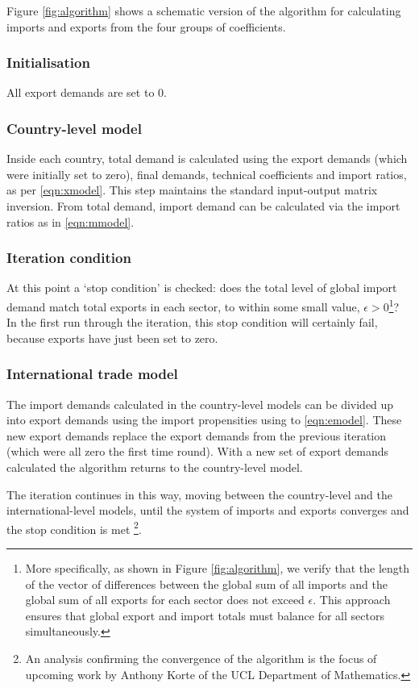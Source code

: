 \documentclass[a4paper]{article}
\begin{document}
Figure \ref{fig:algorithm} shows a schematic version of the algorithm for calculating imports and exports from the four groups of coefficients.
\subsubsection*{Initialisation}
All export demands are set to 0.

\subsubsection*{Country-level model}
Inside each country, total demand is calculated using the export demands (which were initially set to zero), final demands, technical coefficients and import ratios, as per \cref{eqn:xmodel}.
This step maintains the standard input-output matrix inversion.
From total demand, import demand can be calculated via the import ratios as in \cref{eqn:mmodel}.

\subsubsection*{Iteration condition}
At this point a `stop condition' is checked: does the total level of global import demand match total exports in each sector, to within some small value,  $\epsilon > 0$\footnote{More specifically, as shown in Figure \ref{fig:algorithm}, we verify that the length of the vector of differences between the global sum of all imports and the global sum of all exports for each sector does not exceed $\epsilon$. This approach ensures that global export and import totals must balance for all sectors simultaneously.}?
In the first run through the iteration, this stop condition will certainly fail, because exports have just been set to zero.

\subsubsection*{International trade model}
The import demands calculated in the country-level models can be divided up into export demands using the import propensities using to \cref{eqn:emodel}.
These new export demands replace the export demands from the previous iteration (which were all zero the first time round).
With a new set of export demands calculated the algorithm returns to the country-level model.

The iteration continues in this way, moving between the country-level and the international-level models, until the system of imports and exports converges and the stop condition is met \footnote{An analysis confirming the convergence of the algorithm is the focus of upcoming work by Anthony Korte of the UCL Department of Mathematics.}.
\end{document}
